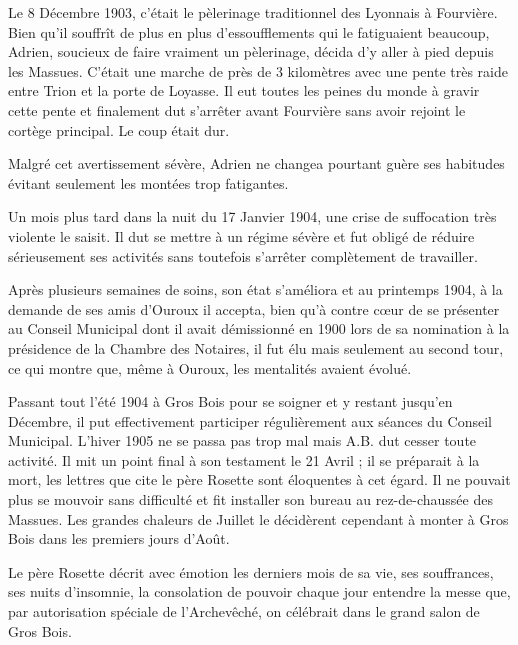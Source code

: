 \documentclass[11pt,a4paper]{report}
\begin{document}
Le 8 Décembre 1903, c'était le pèlerinage traditionnel des Lyonnais à Fourvière. Bien qu'il souffrît de plus en plus d'essoufflements qui le fatiguaient beaucoup, Adrien, soucieux de faire vraiment un pèlerinage, décida d'y aller à pied depuis les Massues. C'était une marche de près de 3 kilomètres avec une pente très raide entre Trion et la porte de Loyasse. Il eut toutes les peines du monde à gravir cette pente et finalement dut s'arrêter avant Fourvière sans avoir rejoint le cortège principal. Le coup était dur.


Malgré cet avertissement sévère, Adrien ne changea pourtant guère ses habitudes évitant seulement les montées trop fatigantes.

Un mois plus tard dans la nuit du 17 Janvier 1904, une crise de suffocation très violente le saisit. Il dut se mettre à un régime sévère et fut obligé de réduire sérieusement ses activités sans toutefois s'arrêter complètement de travailler.

Après plusieurs semaines de soins, son état s'améliora et au printemps 1904, à la demande de ses amis d'Ouroux il accepta, bien qu'à contre cœur de se présenter au Conseil Municipal dont il avait démissionné en 1900 lors de sa nomination à la présidence de la Chambre des Notaires, il fut élu mais seulement au second tour, ce qui montre que, même à Ouroux, les mentalités avaient évolué.

Passant tout l'été 1904 à Gros Bois pour se soigner et y restant jusqu'en Décembre, il put effectivement participer régulièrement aux séances du Conseil Municipal. L'hiver 1905 ne se passa pas trop mal mais A.B. dut cesser toute activité. Il mit un point final à son testament le 21 Avril ; il se préparait à la mort, les lettres que cite le père Rosette sont éloquentes à cet égard. Il ne pouvait plus se mouvoir sans difficulté et fit installer son bureau au rez-de-chaussée des Massues. Les grandes chaleurs de Juillet le décidèrent cependant à monter à Gros Bois dans les premiers jours d'Août.

Le père Rosette décrit avec émotion les derniers mois de sa vie, ses souffrances, ses nuits d'insomnie, la consolation de pouvoir chaque jour entendre la messe que, par autorisation spéciale de l'Archevêché, on célébrait dans le grand salon de Gros Bois.
\end{document}

